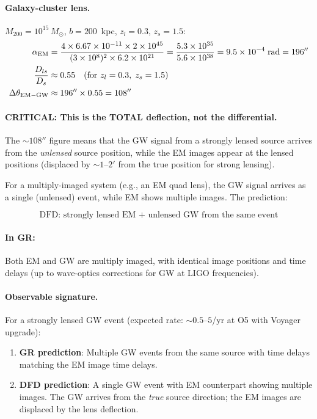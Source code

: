\documentclass[11pt,a4paper]{article}
\newcommand{\ee}[1]{\times 10^{#1}}
\begin{document}
\paragraph{Galaxy-cluster lens.}
$M_{200} = 10^{15}\,M_\odot$, $b = 200$~kpc, $z_l = 0.3$, $z_s = 1.5$:
\begin{align}
\alpha_{\rm EM} &= \frac{4 \times 6.67\ee{-11} \times 2\ee{45}}{(3\ee{8})^2
  \times 6.2\ee{21}} = \frac{5.3\ee{35}}{5.6\ee{38}} = 9.5\ee{-4}\;\text{rad}
  = 196'' \\
\frac{D_{ls}}{D_s} &\approx 0.55 \quad (\text{for } z_l = 0.3,\; z_s = 1.5) \\
\Delta\theta_{\rm EM-GW} &\approx 196'' \times 0.55 = 108''
\end{align}

\paragraph{CRITICAL: This is the TOTAL deflection, not the differential.}
The $\sim 108''$ figure means that the GW signal from a strongly lensed
source arrives from the \emph{unlensed} source position, while the EM
images appear at the lensed positions (displaced by $\sim 1$--$2'$
from the true position for strong lensing).

For a multiply-imaged system (e.g., an EM quad lens), the GW signal
arrives as a single (unlensed) event, while EM shows multiple images.
The prediction:

\begin{equation}
\boxed{
\text{DFD: strongly lensed EM + unlensed GW from the same event}
}
\end{equation}

\paragraph{In GR:} Both EM and GW are multiply imaged, with identical
image positions and time delays (up to wave-optics corrections for
GW at LIGO frequencies).

\paragraph{Observable signature.}
For a strongly lensed GW event (expected rate: $\sim 0.5$--$5$/yr at
O5 with Voyager upgrade):
\begin{enumerate}
\item \textbf{GR prediction}: Multiple GW events from the same source
  with time delays matching the EM image time delays.
\item \textbf{DFD prediction}: A single GW event with EM counterpart
  showing multiple images.  The GW arrives from the \emph{true} source
  direction; the EM images are displaced by the lens deflection.
\end{enumerate}
\end{document}
